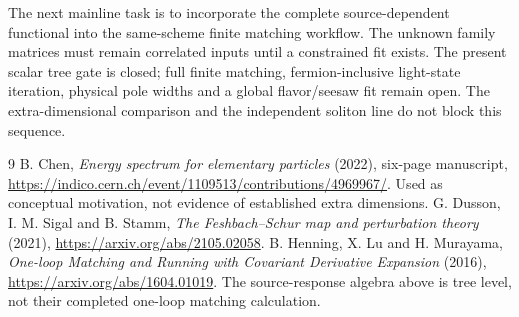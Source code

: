 \documentclass[11pt]{article}
\begin{document}
The next mainline task is to incorporate the complete source-dependent
functional into the same-scheme finite matching workflow. The unknown
family matrices must remain correlated inputs until a constrained fit
exists. The present scalar tree gate is closed; full finite matching,
fermion-inclusive light-state iteration, physical pole widths and a
global flavor/seesaw fit remain open. The extra-dimensional comparison
and the independent soliton line do not block this sequence.

\begin{thebibliography}{9}
 B. Chen, \emph{Energy spectrum for elementary particles}
(2022), six-page manuscript,
\url{https://indico.cern.ch/event/1109513/contributions/4969967/}.
Used as conceptual motivation, not evidence of established extra dimensions.
 G. Dusson, I. M. Sigal and B. Stamm,
\emph{The Feshbach--Schur map and perturbation theory} (2021),
\url{https://arxiv.org/abs/2105.02058}.
 B. Henning, X. Lu and H. Murayama,
\emph{One-loop Matching and Running with Covariant Derivative Expansion}
(2016), \url{https://arxiv.org/abs/1604.01019}.
The source-response algebra above is tree level, not their completed
one-loop matching calculation.
\end{thebibliography}
\end{document}
